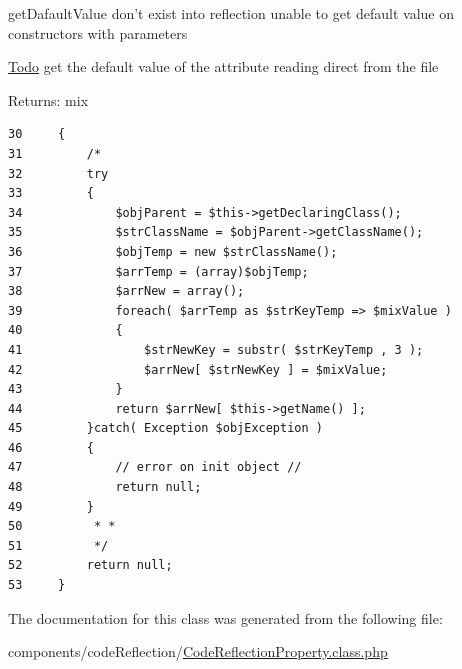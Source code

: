 getDafaultValue don't exist into reflection  unable to get default value on constructors with parameters \begin{Desc}
\item[\hyperlink{todo__todo000003}{Todo}]get the default value of the attribute reading direct from the file \end{Desc}
\begin{Desc}
\item[Returns:]mix \end{Desc}


\begin{Code}\begin{verbatim}30     {
31         /*
32         try
33         {
34             $objParent = $this->getDeclaringClass();
35             $strClassName = $objParent->getClassName();
36             $objTemp = new $strClassName();
37             $arrTemp = (array)$objTemp;
38             $arrNew = array();
39             foreach( $arrTemp as $strKeyTemp => $mixValue )
40             {
41                 $strNewKey = substr( $strKeyTemp , 3 );
42                 $arrNew[ $strNewKey ] = $mixValue;
43             }
44             return $arrNew[ $this->getName() ];
45         }catch( Exception $objException )
46         {
47             // error on init object //
48             return null;
49         }
50          * *
51          */
52         return null;
53     }
\end{verbatim}
\end{Code}




The documentation for this class was generated from the following file:\begin{CompactItemize}
\item 
components/codeReflection/\hyperlink{_code_reflection_property_8class_8php}{CodeReflectionProperty.class.php}\end{CompactItemize}
